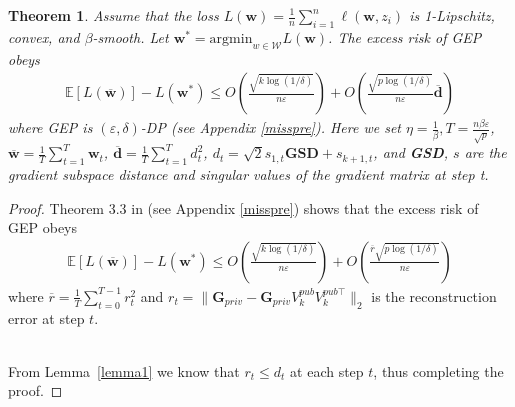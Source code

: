 \documentclass[11pt]{article}
\renewcommand{\epsilon}{\varepsilon}
\newtheorem{theorem}{Theorem}
\begin{document}
\begin{theorem}
\label{theorem1}
Assume that the loss $L(\mathbf{w}) = \frac{1}{n} \sum_{i=1}^n \ell\left(\mathbf{w}, z_i\right)$ is 1-Lipschitz, convex, and $\beta$-smooth. Let $\mathbf{w}^* = \mathrm{argmin}_{w \in \mathcal{W}} L(\mathbf{w})$. The excess risk of GEP obeys
\begin{equation}
\begin{aligned}
    \mathbb{E}[L(\overline{\boldsymbol{\mathbf{w}}})]-L\left(\boldsymbol{\mathbf{w}}^*\right) \le O\left(\frac{\sqrt{k\log(1/\delta)}}{n\epsilon}\right) + O\left(\frac{\sqrt{p\log(1/\delta)}}{n\epsilon}\overline{\boldsymbol{\mathbf{d}}}\right)
\end{aligned}
\end{equation}
where GEP is $(\epsilon, \delta)$-DP (see Appendix \ref{misspre}). Here we set $\eta=\frac{1}{\beta}, T=\frac{n \beta \epsilon}{\sqrt{p}}$, $\overline{\boldsymbol{\mathbf{w}}} = \frac{1}{T}\sum_{t=1}^{T}\mathbf{w}_t$, $\overline{\boldsymbol{\mathbf{d}}} = \frac{1}{T}\sum_{t=1}^{T}d^2_t$, $d_t = \sqrt{2}s_{1, t}\mathbf{GSD} + s_{k + 1, t}$, and \textbf{GSD}, $s$ are the gradient subspace distance and singular values of the gradient matrix at step t.
\end{theorem}

\begin{proof}
    Theorem 3.3 in \cite{donot} (see Appendix \ref{misspre}) shows that the excess risk of GEP obeys
    \begin{equation}
    \begin{aligned}
        \mathbb{E}[L(\overline{\boldsymbol{\mathbf{w}}})]-L\left(\boldsymbol{\mathbf{w}}^*\right) \le O\left(\frac{\sqrt{k\log(1/\delta)}}{n\epsilon}\right) + O\left(\frac{\overline{r}\sqrt{p\log(1/\delta)}}{n\epsilon}\right)
    \end{aligned}
    \end{equation}
    where $\overline{r} = \frac{1}{T}\sum_{t=0}^{T-1}r^2_t$ and $r_t = \|\mathbf{G}_{p r i v}-\mathbf{G}_{p r i v} V_k^{p u b} V_k^{p u b \top}\|_2$ is the reconstruction error at step $t$.

    ~\\
    From Lemma~\ref{lemma1} we know that $r_t \leq d_t$ at each step $t$, thus completing the proof. 
\end{proof}
\end{document}
